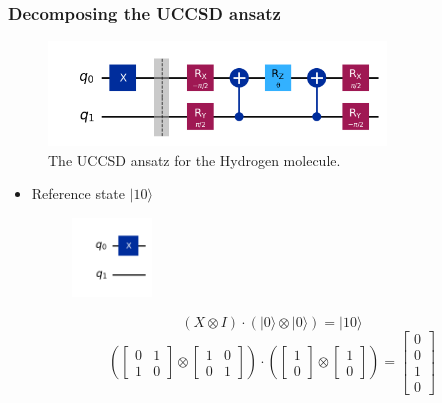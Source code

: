 \documentclass{article}
\begin{document}
\subsubsection*{Decomposing the UCCSD ansatz}
\begin{figure}[h]
	\centering
	\includegraphics[width=0.8\textwidth, height=0.2\textheight]{Circ.png}
	\caption{The UCCSD ansatz for the Hydrogen molecule.}
	\label{fig:yourlabel}
\end{figure}
\begin{itemize}
	\item Reference state \(|10 \rangle\)
	      \begin{figure}[H]
		      \centering
		      \includegraphics[width=0.2\textwidth, height=0.2\textheight]{ref.png}
	      \end{figure}
	      \[
		      \left( X \otimes I\right) \cdot \left( |0 \rangle \otimes | 0 \rangle \right) = |10 \rangle
	      \]
	      \[
		      \left(
		      \begin{bmatrix}
				      0 & 1 \\
				      1 & 0
			      \end{bmatrix}
		      \otimes
		      \begin{bmatrix}
				      1 & 0 \\
				      0 & 1
			      \end{bmatrix}
		      \right)
		      \cdot
		      \left(
		      \begin{bmatrix}
				      1 \\
				      0
			      \end{bmatrix}
		      \otimes
		      \begin{bmatrix}
				      1 \\
				      0
			      \end{bmatrix}
		      \right)
		      =
		      \begin{bmatrix}
			      0 \\
			      0 \\
			      1 \\
			      0
		      \end{bmatrix}
	      \]


\end{itemize}
\end{document}
